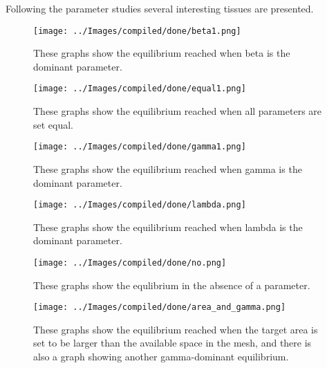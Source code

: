 
Following the parameter studies several interesting tissues are presented.

\begin{figure}[h]
\centering
\texttt{[image: ../Images/compiled/done/beta1.png]}
\caption[Beta Dominant Output]{These graphs show the equilibrium reached when beta is the dominant parameter.}
\end{figure}
\begin{figure}[h]
\centering
\texttt{[image: ../Images/compiled/done/equal1.png]}
\caption[Equal Parameter Output]{These graphs show the equilibrium reached when all parameters are set equal.}
\end{figure}
\begin{figure}[h]
\centering
\texttt{[image: ../Images/compiled/done/gamma1.png]}
\caption[Gamma Dominant Output]{These graphs show the equilibrium reached when gamma is the dominant parameter.}
\end{figure}
\begin{figure}[h]
\centering
\texttt{[image: ../Images/compiled/done/lambda.png]}
\caption[Lambda Dominant Output]{These graphs show the equilibrium reached when lambda is the dominant parameter.}
\end{figure}
\begin{figure}[h]
\centering
\texttt{[image: ../Images/compiled/done/no.png]}
\caption[Missing Parameter Output]{These graphs show the equlibrium in the absence of a parameter.}
\end{figure}
\begin{figure}[h]
\centering
\texttt{[image: ../Images/compiled/done/area\_and\_gamma.png]}
\caption[Large Area Output]{These graphs show the equilibrium reached when the target area is set to be larger than the available space in the mesh, and there is also a graph showing another gamma-dominant equilibrium.}
\end{figure}


